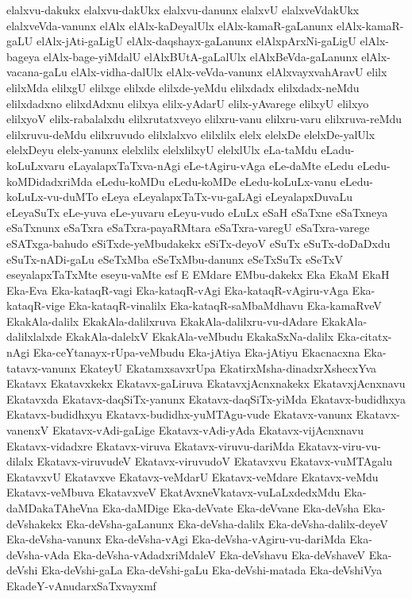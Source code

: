 {elalxvu-dakukx
elalxvu-dakUkx
elalxvu-danunx
elalxvU
elalxveVdakUkx
elalxveVda-vanunx
elAlx
elAlx-kaDeyalUlx
elAlx-kamaR-gaLanunx
elAlx-kamaR-gaLU
elAlx-jAti-gaLigU
elAlx-daqshayx-gaLanunx
elAlxpArxNi-gaLigU
elAlx-bageya
elAlx-bage-yiMdalU
elAlxBUtA-gaLalUlx
elAlxBeVda-gaLanunx
elAlx-vacana-gaLu
elAlx-vidha-dalUlx
elAlx-veVda-vanunx
elAlxvayxvahAravU
elilx
elilxMda
elilxgU
elilxge
elilxde
elilxde-yeMdu
elilxdadx
elilxdadx-neMdu
elilxdadxno
elilxdAdxnu
elilxya
elilx-yAdarU
elilx-yAvarege
elilxyU
elilxyo
elilxyoV
elilx-rabalalxdu
elilxrutatxveyo
elilxru-vanu
elilxru-varu
elilxruva-reMdu
elilxruvu-deMdu
elilxruvudo
elilxlalxvo
elilxlilx
elelx
elelxDe
elelxDe-yalUlx
elelxDeyu
elelx-yanunx
elelxlilx
elelxlilxyU
elelxlUlx
eLa-taMdu
eLadu-koLuLxvaru
eLayalapxTaTxva-nAgi
eLe-tAgiru-vAga
eLe-daMte
eLedu
eLedu-koMDidadxriMda
eLedu-koMDu
eLedu-koMDe
eLedu-koLuLx-vanu
eLedu-koLuLx-vu-duMTo
eLeya
eLeyalapxTaTx-vu-gaLAgi
eLeyalapxDuvaLu
eLeyaSuTx
eLe-yuva
eLe-yuvaru
eLeyu-vudo
eLuLx
eSaH
eSaTxne
eSaTxneya
eSaTxnunx
eSaTxra
eSaTxra-payaRMtara
eSaTxra-varegU
eSaTxra-varege
eSATxga-bahudo
eSiTxde-yeMbudakekx
eSiTx-deyoV
eSuTx
eSuTx-doDaDxdu
eSuTx-nADi-gaLu
eSeTxMba
eSeTxMbu-danunx
eSeTxSuTx
eSeTxV
eseyalapxTaTxMte
eseyu-vaMte
esf
E
EMdare
EMbu-dakekx
Eka
EkaM
EkaH
Eka-Eva
Eka-kataqR-vagi
Eka-kataqR-vAgi
Eka-kataqR-vAgiru-vAga
Eka-kataqR-vige
Eka-kataqR-vinalilx
Eka-kataqR-saMbaMdhavu
Eka-kamaRveV
EkakAla-dalilx
EkakAla-dalilxruva
EkakAla-dalilxru-vu-dAdare
EkakAla-dalilxlalxde
EkakAla-dalelxV
EkakAla-veMbudu
EkakaSxNa-dalilx
Eka-citatx-nAgi
Eka-ceYtanayx-rUpa-veMbudu
Eka-jAtiya
Eka-jAtiyu
Ekacnacxna
Eka-tatavx-vanunx
EkateyU
EkatamxsavxrUpa
EkatirxMsha-dinadxrXshecxYva
Ekatavx
Ekatavxkekx
Ekatavx-gaLiruva
EkatavxjAcnxnakekx
EkatavxjAcnxnavu
Ekatavxda
Ekatavx-daqSiTx-yanunx
Ekatavx-daqSiTx-yiMda
Ekatavx-budidhxya
Ekatavx-budidhxyu
Ekatavx-budidhx-yuMTAgu-vude
Ekatavx-vanunx
Ekatavx-vanenxV
Ekatavx-vAdi-gaLige
Ekatavx-vAdi-yAda
Ekatavx-vijAcnxnavu
Ekatavx-vidadxre
Ekatavx-viruva
Ekatavx-viruvu-dariMda
Ekatavx-viru-vu-dilalx
Ekatavx-viruvudeV
Ekatavx-viruvudoV
Ekatavxvu
Ekatavx-vuMTAgalu
EkatavxvU
Ekatavxve
Ekatavx-veMdarU
Ekatavx-veMdare
Ekatavx-veMdu
Ekatavx-veMbuva
EkatavxveV
EkatAvxneVkatavx-vuLaLxdedxMdu
Eka-daMDakaTAheVna
Eka-daMDige
Eka-deVvate
Eka-deVvane
Eka-deVsha
Eka-deVshakekx
Eka-deVsha-gaLanunx
Eka-deVsha-dalilx
Eka-deVsha-dalilx-deyeV
Eka-deVsha-vanunx
Eka-deVsha-vAgi
Eka-deVsha-vAgiru-vu-dariMda
Eka-deVsha-vAda
Eka-deVsha-vAdadxriMdaleV
Eka-deVshavu
Eka-deVshaveV
Eka-deVshi
Eka-deVshi-gaLa
Eka-deVshi-gaLu
Eka-deVshi-matada
Eka-deVshiVya
EkadeY-vAnudarxSaTxvayxmf
}
